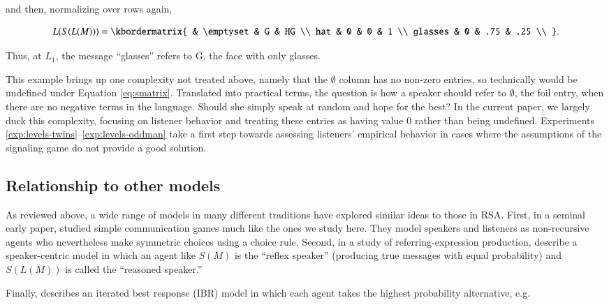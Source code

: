 \documentclass[man,noapacite]{apa2}
\newcounter{Experiment}
\newcommand{\exptrefrange}[2]{Experiments\,\ref{#1}--\ref{#2}}
\begin{document}
\noindent and then, normalizing over rows again,

\begin{equation}
L(S(L(M))) = \kbordermatrix{
  & \emptyset & G & HG \\
  hat & 0 & 0 & 1 \\
  glasses & 0 & .75 & .25 \\
}.
\end{equation}

\noindent Thus, at $L_1$, the message ``glasses'' refers to {\sc G}, the face with only glasses.

This example brings up one complexity not treated above, namely that the $\emptyset$ column has no non-zero entries, so technically would be undefined under Equation \ref{eq:smatrix}. Translated into practical terms, the question is how a speaker should refer to $\emptyset$, the foil entry, when there are no negative terms in the language. Should she simply speak at random and hope for the best? In the current paper, we largely duck this complexity, focusing on listener behavior and treating these entries as having value 0 rather than being undefined. \exptrefrange{exp:levels-twins}{exp:levels-oddman} take a first step towards assessing listeners' empirical behavior in cases where the assumptions of the signaling game do not provide a good solution.

\subsection{Relationship to other models}

As reviewed above, a wide range of models in many different traditions have explored similar ideas to those in RSA.
First, in a seminal early paper,  studied simple communication games much like the ones we study here. They model speakers and listeners as non-recursive agents who nevertheless make symmetric choices using a  choice rule. Second, in a study of referring-expression production,  describe a speaker-centric model in which an agent like $S(M)$ is the ``reflex speaker'' (producing true messages with equal probability) and $S(L(M))$ is called the ``reasoned speaker.''

Finally,  describes an iterated best response (IBR) model in which each agent takes the highest probability alternative, e.g.
\end{document}
